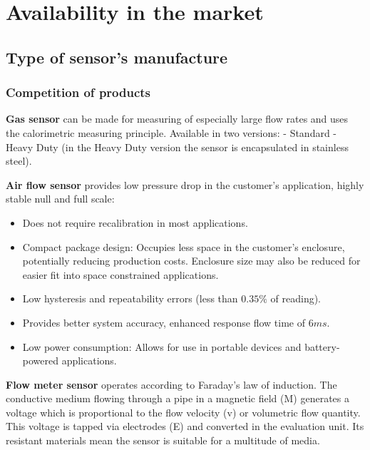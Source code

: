 \chapter{Availability in the market}

\section{Type of sensor’s manufacture}
\subsection{Competition of products}
\textbf{Gas sensor} can be made for measuring of especially large flow rates and uses the calorimetric measuring principle. Available in two versions: - Standard - Heavy Duty (in the Heavy Duty version the sensor is encapsulated in stainless steel).

\textbf{Air flow sensor} provides low pressure drop in the customer’s application, highly stable null and full scale: 
\begin{itemize}
	\item Does not require recalibration in most applications.
	\item Compact package design: Occupies less space in the customer’s enclosure, potentially reducing production costs. Enclosure size may also be reduced for easier fit into space constrained applications.
	\item Low hysteresis and repeatability errors (less than $ 0.35\% $ of reading).
	\item Provides better system accuracy, enhanced response flow time of $ 6 ms $.
	\item Low power consumption: Allows for use in portable devices and battery-powered applications.
\end{itemize}

\textbf{Flow meter sensor} operates according to Faraday's law of induction. The conductive medium flowing through a pipe in a magnetic field (M) generates a voltage which is proportional to the flow velocity (v) or volumetric flow quantity. This voltage is tapped via electrodes (E) and converted in the evaluation unit. Its resistant materials mean the sensor is suitable for a multitude of media.

